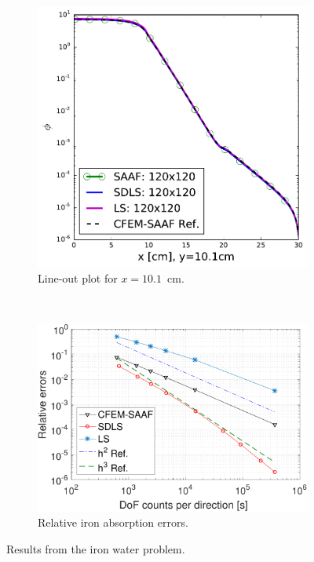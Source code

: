 \documentclass[review]{elsarticle}
\begin{document}
\begin{figure}[ht!]
	\begin{subfigure}{.5\textwidth}
		\centering
		\hspace*{-2cm}\includegraphics[width=.95\linewidth]{along-x}
		\caption{Line-out plot for $x=10.1$\ cm.}
		\label{f:line}
	\end{subfigure}
	~
	\begin{subfigure}{.5\textwidth}
		\centering
		\hspace*{-0cm}\includegraphics[width=1.4\linewidth]{cdls-iw-err-dof.pdf}
		\caption{Relative iron absorption errors.}
		\label{f:e_abs}
	\end{subfigure}
	\caption{Results from the iron water problem.}
	\label{f:iw}
\end{figure}
\end{document}
